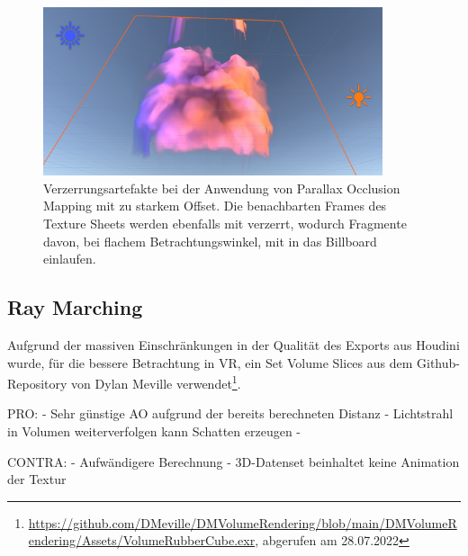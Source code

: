 \begin{figure}[h!]
	\includegraphics[width=0.89\textwidth]{Grafiken/Evaluation/Smoke_artefacts.png}
	\centering
	\begin{footnotesize}
		\caption{Verzerrungsartefakte bei der Anwendung von Parallax Occlusion Mapping mit zu starkem Offset. Die benachbarten Frames des Texture Sheets
			werden ebenfalls mit verzerrt, wodurch Fragmente davon, bei flachem Betrachtungswinkel, mit in das Billboard einlaufen.}
		\label{fig:smokeBleeding}
	\end{footnotesize}
\end{figure}



\subsection{Ray Marching}
\label{sec:5.2}

Aufgrund der massiven Einschränkungen in der Qualität des Exports aus Houdini wurde, für die bessere Betrachtung in VR, ein Set Volume Slices aus dem 
Github-Repository von Dylan Meville verwendet\footnote{\url{https://github.com/DMeville/DMVolumeRendering/blob/main/DMVolumeRendering/Assets/VolumeRubberCube.exr}, abgerufen am 28.07.2022}.



PRO: \newline
- Sehr günstige AO aufgrund der bereits berechneten Distanz\newline
- Lichtstrahl in Volumen weiterverfolgen kann Schatten erzeugen\newline
-

CONTRA: \newline
- Aufwändigere Berechnung\newline
- 3D-Datenset beinhaltet keine Animation der Textur\newline




